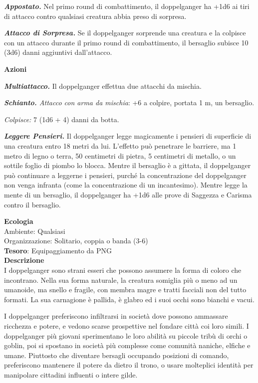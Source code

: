 \begin{multicols}{2}
\textit{\textbf{Appostato.}} Nel primo round di combattimento, il doppelganger ha +1d6 ai tiri di attacco contro qualsiasi creatura abbia preso di sorpresa.

\textit{\textbf{Attacco di Sorpresa.}} Se il doppelganger sorprende una creatura e la colpisce con un attacco durante il primo round di combattimento, il bersaglio subisce 10 (3d6) danni aggiuntivi dall'attacco.

\textbf{Azioni}

\textit{\textbf{Multiattacco.}} Il doppelganger effettua due attacchi da mischia.

\textit{\textbf{Schianto.} Attacco con arma da mischia}: +6 a colpire, portata 1 m, un bersaglio.

\textit{Colpisce:} 7 (1d6 + 4) danni da botta.

\textit{\textbf{Leggere Pensieri.}} Il doppelganger legge magicamente i pensieri di superficie di una creatura entro 18 metri da lui. L'effetto può penetrare le barriere, ma 1 metro di legno o terra, 50 centimetri di pietra, 5 centimetri di metallo, o un sottile foglio di piombo lo blocca. Mentre il bersaglio è a gittata, il doppelganger può continuare a leggerne i pensieri, purché la concentrazione del doppelganger non venga infranta (come la concentrazione di un incantesimo). Mentre legge la mente di un bersaglio, il doppelganger ha +1d6 alle prove di Saggezza e Carisma contro il bersaglio.

\textbf{Ecologia}\\
Ambiente: Qualsiasi\\
Organizzazione: Solitario, coppia o banda (3-6)\\
\textbf{Tesoro}: Equipaggiamento da PNG\\
\textbf{Descrizione}\\
I doppelganger sono strani esseri che possono assumere la forma di coloro che incontrano. Nella sua forma naturale, la creatura somiglia più o meno ad un umanoide, ma snello e fragile, con membra magre e tratti facciali non del tutto formati. La sua carnagione è pallida, è glabro ed i suoi occhi sono bianchi e vacui.

I doppelganger preferiscono infiltrarsi in società dove possono ammassare ricchezza e potere, e vedono scarse prospettive nel fondare città coi loro simili. I doppelganger più giovani sperimentano le loro abilità su piccole tribù di orchi o goblin, poi si spostano in società più complesse come comunità naniche, elfiche e umane. Piuttosto che diventare bersagli occupando posizioni di comando, preferiscono mantenere il potere da dietro il trono, o usare molteplici identità per manipolare cittadini influenti o intere gilde.


\end{multicols}
